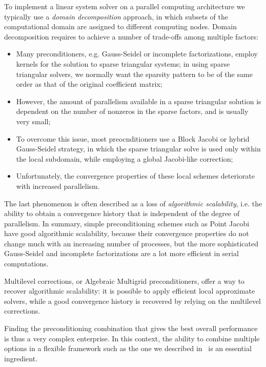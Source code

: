 To implement a linear system solver on a parallel computing
architecture we typically use a \emph{domain decomposition} approach,
in which subsets of the computational domain are assigned to different
computing nodes. Domain decomposition requires to achieve a number of
trade-offs among multiple factors:
\begin{itemize}
\item Many preconditioners, e.g. Gauss-Seidel or incomplete
  factorizations, employ kernels for the solution to sparse triangular
  systems; in using sparse triangular solvers, we normally  want the
  sparsity pattern to be of the same order as that of the original
  coefficient matrix;
\item However, the amount of parallelism available in a sparse
  triangular solution is dependent on the number of nonzeros in the
  sparse factors, and is usually very small;
\item To overcome this issue, most preocnditioners use a Block Jacobi
  or hybrid Gauss-Seidel strategy, in which the sparse triangular
  solve is used only within the local subdomain, while employing a
  global Jacobi-like correction;
\item Unfortunately, the convergence properties of these local schemes
  deteriorate with increased parallelism.
\end{itemize}
The last phenomenon is often described as a loss of \emph{algorithmic
  scalability}, i.e. the ability to obtain a convergence history that
is independent of the degree of parallelism. In summary, simple
preconditioning schemes such as Point Jacobi have good algorithmic scalability,
because their convergence properties do not change much with an
increasing number of processes, but the more sophisticated
Gauss-Seidel and incomplete factorizations are a lot more efficient in
serial computations. 

Multilevel corrections, or Algebraic Multigrid  preconditioners, offer
a way to recover algorithmic scalability:
it is possible to apply efficient local approximate solvers, while a
good convergence history is recovered by relying on the multilevel
corrections. 

Finding the preconditioning combination that gives the best overall
performance is thus a very complex enterprise. In this context, the
ability to combine multiple options in a flexible framework such as
the one we described in~\cite{mld-toms} is an essential ingredient. 


